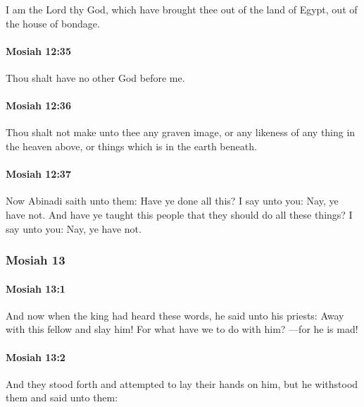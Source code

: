 			I am the Lord thy God,
			which have brought thee out of the land of Egypt,
			out of the house of bondage.

		\paragraph{Mosiah 12:35} %
			\label{MOSIAH-12-35}

			Thou shalt have no other God before me.

		\paragraph{Mosiah 12:36} %
			\label{MOSIAH-12-36}

			Thou shalt not make unto thee any graven image,
			or any likeness of any thing in the heaven above,
			or things which is in the earth beneath.

		\paragraph{Mosiah 12:37} %
			\label{MOSIAH-12-37}

			Now Abinadi saith unto them:
			Have ye done all this?
			I say unto you:
			Nay, ye have not.
			And have ye taught this people that they should do all these things?
			I say unto you:
			Nay, ye have not.

	\subsubsection{Mosiah 13} %
		\label{MOSIAH-13}
		
		\paragraph{Mosiah 13:1} %
			\label{MOSIAH-13-1}

			And now when the king had heard these words,
			he said unto his priests:
			Away with this fellow and slay him!
			For what have we to do with him?
			---for he is mad!

		\paragraph{Mosiah 13:2} %
			\label{MOSIAH-13-2}

			And they stood forth and attempted to lay their hands on him,
			but he withstood them and said unto them:

